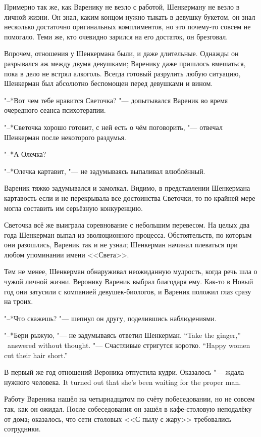 Примерно так же, как Варенику не везло с работой, Шенкерману не везло в личной жизни.
Он знал, каким концом нужно тыкать в девушку букетом, он знал несколько достаточно оригинальных комплиментов, но это почему-то совсем не помогало.
Теми же, кто очевидно зарился на его достаток, он брезговал.

Впрочем, отношения у Шенкермана были, и даже длительные.
Однажды он разрывался аж между двумя девушками;
Варенику даже пришлось вмешаться, пока в дело не встрял алкоголь.
Всегда готовый разрулить любую ситуацию, Шенкерман был абсолютно беспомощен перед девушками и вином.

"--*Вот чем тебе нравится Светочка? "--- допытывался Вареник во время очередного сеанса психотерапии.

"--*Светочка хорошо готовит, с ней есть о чём поговорить, "--- отвечал Шенкерман после некоторого раздумья.

"--*А Олечка?

"--*Олечка картавит, "--- не задумываясь выпаливал влюблённый.

Вареник тяжко задумывался и замолкал.
Видимо, в представлении Шенкермана картавость если и не перекрывала все достоинства Светочки, то по крайней мере могла составить им серьёзную конкуренцию.

Светочка всё же выиграла соревнование с небольшим перевесом.
На целых два года Шенкерман выпал из эволюционного процесса.
Обстоятельств, по которым они разошлись, Вареник так и не узнал;
Шенкерман начинал плеваться при любом упоминании имени <<Света>>.

Тем не менее, Шенкерман обнаруживал неожиданную мудрость, когда речь шла о чужой личной жизни.
Веронику Вареник выбрал благодаря ему.
Как-то в Новый год они затусили с компанией девушек-биологов, и Вареник положил глаз сразу на троих.

"--*Что скажешь? "--- шепнул он другу, поделившись наблюдениями.

{"--*Бери рыжую, "--- не задумываясь ответил Шенкерман.}
{``Take the ginger,'' \Shenkerman\  answered without thought.}
{"--- Счастливые стригутся коротко.}
{``Happy women cut their hair short.''}

В первый же год отношений Вероника отпустила кудри.
{Оказалось "--- ждала нужного человека.}
{It turned out that she's been waiting for the proper man.}

\asterism

\label{Tue_2012_04_24}

Работу Вареника нашёл на четырнадцатом по счёту побеседовании, но не совсем так, как он ожидал.
После собеседования он зашёл в кафе-столовую неподалёку от дома;
оказалось, что сети столовых <<С пылу с жару>> требовались сотрудники.

